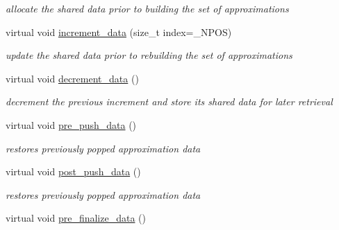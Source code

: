 \begin{DoxyCompactItemize}
\begin{DoxyCompactList}\small\item\em allocate the shared data prior to building the set of approximations \end{DoxyCompactList}\item 
virtual void \hyperlink{classPecos_1_1SharedPolyApproxData_a4890d7d6305c020f7b6885b46760bc1f}{increment\+\_\+data} (size\+\_\+t index=\+\_\+\+N\+P\+OS)\label{classPecos_1_1SharedPolyApproxData_a4890d7d6305c020f7b6885b46760bc1f}

\begin{DoxyCompactList}\small\item\em update the shared data prior to rebuilding the set of approximations \end{DoxyCompactList}\item 
virtual void \hyperlink{classPecos_1_1SharedPolyApproxData_a60174b370eea362e66f5e90876f3c1be}{decrement\+\_\+data} ()\label{classPecos_1_1SharedPolyApproxData_a60174b370eea362e66f5e90876f3c1be}

\begin{DoxyCompactList}\small\item\em decrement the previous increment and store its shared data for later retrieval \end{DoxyCompactList}\item 
virtual void \hyperlink{classPecos_1_1SharedPolyApproxData_aa93398a5eb72ec751abeb270a80998b9}{pre\+\_\+push\+\_\+data} ()\label{classPecos_1_1SharedPolyApproxData_aa93398a5eb72ec751abeb270a80998b9}

\begin{DoxyCompactList}\small\item\em restores previously popped approximation data \end{DoxyCompactList}\item 
virtual void \hyperlink{classPecos_1_1SharedPolyApproxData_ac19cc0185f757af210f8bc3a31dc85b7}{post\+\_\+push\+\_\+data} ()\label{classPecos_1_1SharedPolyApproxData_ac19cc0185f757af210f8bc3a31dc85b7}

\begin{DoxyCompactList}\small\item\em restores previously popped approximation data \end{DoxyCompactList}\item 
virtual void \hyperlink{classPecos_1_1SharedPolyApproxData_a9fedd7fa45f9bfa49d99507fe7bdaca2}{pre\+\_\+finalize\+\_\+data} ()\label{classPecos_1_1SharedPolyApproxData_a9fedd7fa45f9bfa49d99507fe7bdaca2}


\end{DoxyCompactItemize}
